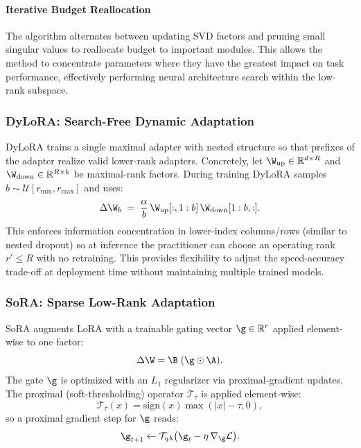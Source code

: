\paragraph{Iterative Budget Reallocation}
The algorithm alternates between updating SVD factors and pruning small singular values to reallocate budget to important modules. This allows the method to concentrate parameters where they have the greatest impact on task performance, effectively performing neural architecture search within the low-rank subspace.

\subsubsection{DyLoRA: Search-Free Dynamic Adaptation}
\label{subsubsec:dylora}

DyLoRA trains a single maximal adapter with nested structure so that prefixes of the adapter realize valid lower-rank adapters. Concretely, let $\W_{\text{up}}\in\mathbb{R}^{d\times R}$ and $\W_{\text{down}}\in\mathbb{R}^{R\times k}$ be maximal-rank factors. During training DyLoRA samples $b\sim\mathcal{U}[r_{\min},r_{\max}]$ and uses:
\begin{equation}
  \Delta\W_b \;=\; \frac{\alpha}{b}\,\W_{\text{up}}[:,1:b]\,\W_{\text{down}}[1:b,:].
\end{equation}
This enforces information concentration in lower-index columns/rows (similar to nested dropout) so at inference the practitioner can choose an operating rank $r'\le R$ with no retraining. This provides flexibility to adjust the speed-accuracy trade-off at deployment time without maintaining multiple trained models.

\subsubsection{SoRA: Sparse Low-Rank Adaptation}
\label{subsubsec:sora}

SoRA augments LoRA with a trainable gating vector $\g\in\mathbb{R}^{r}$ applied element-wise to one factor:
\begin{equation}
  \Delta\W = \B\;(\g\odot \A).
\end{equation}
The gate $\g$ is optimized with an $L_1$ regularizer via proximal-gradient updates. The proximal (soft-thresholding) operator $\mathcal{T}_{\tau}$ is applied element-wise:
\begin{equation}
  \mathcal{T}_{\tau}(x) = \mathrm{sign}(x)\max(|x|-\tau,0),
\end{equation}
so a proximal gradient step for $\g$ reads:
\begin{equation}
  \g_{t+1} \leftarrow \mathcal{T}_{\eta\lambda}\big(\g_t - \eta\,\nabla_{\g}\mathcal{L}\big).
\end{equation}

